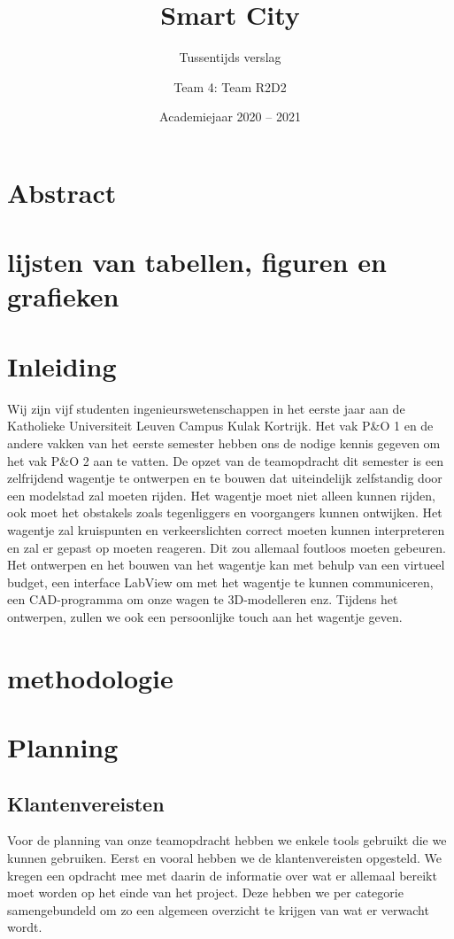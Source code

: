 \documentclass[a4paper,twoside,kulak]{kulakreport}
\title{Smart City}
\subtitle{Tussentijds verslag}
\author{Team 4: Team R2D2}
\institute{Matthijs Deforche, Karl Van Holder, Thomas Varheust, Kobe De Weerdt, Yaron Verhulst}
\date{Academiejaar 2020 -- 2021}
\begin{document}
	\titlepage
	
	\chapter*{Abstract}
	
	\renewcommand*\contentsname{Inhoud}
	\tableofcontents
	
	\chapter{lijsten van tabellen, figuren en grafieken}
	
	\chapter*{Inleiding}
	Wij zijn vijf studenten ingenieurswetenschappen in het eerste jaar aan de Katholieke Universiteit Leuven Campus Kulak Kortrijk.
	Het vak P\&O 1 en de andere vakken van het eerste semester hebben ons de nodige kennis gegeven om het vak P\&O 2 aan te vatten. 
	De opzet van de teamopdracht dit semester is een zelfrijdend wagentje te ontwerpen en te bouwen dat uiteindelijk zelfstandig door een modelstad zal moeten rijden. Het wagentje moet niet alleen kunnen rijden, ook moet het obstakels zoals tegenliggers en voorgangers kunnen ontwijken. Het wagentje zal kruispunten en verkeerslichten correct moeten kunnen interpreteren en zal er gepast op moeten reageren. Dit zou allemaal foutloos moeten gebeuren. Het ontwerpen en het bouwen van het wagentje kan met behulp van een virtueel budget, een interface LabView om met het wagentje te kunnen communiceren, een CAD-programma om onze wagen te 3D-modelleren enz. 
	Tijdens het ontwerpen, zullen we ook een persoonlijke touch aan het wagentje geven. 
	
	\chapter{methodologie}
	
	
	
	\chapter{Planning}
	\section{Klantenvereisten}
	Voor de planning van onze teamopdracht hebben we enkele tools gebruikt die we kunnen gebruiken. Eerst en vooral hebben we de klantenvereisten opgesteld. We kregen een opdracht mee met daarin de informatie over wat er allemaal bereikt moet worden op het einde van het project. Deze hebben we per categorie samengebundeld om zo een algemeen overzicht te krijgen van wat er verwacht wordt. 
\end{document}
